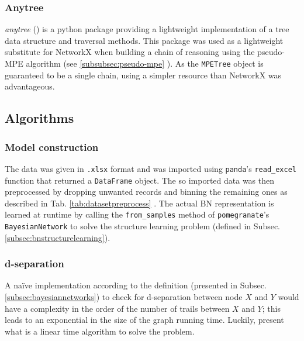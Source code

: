 \subsubsection{Anytree}
\textit{anytree} (\cite{anytree}) is a python package providing a lightweight implementation of a tree data structure and traversal methods.
This package was used as a lightweight substitute for NetworkX when building a chain of reasoning using the pseudo-MPE algorithm (see \ref{subsubsec:pseudo-mpe} ).
As the \texttt{MPETree} object is guaranteed to be a single chain, using a simpler resource than NetworkX was advantageous.

\subsection{Algorithms}

\subsubsection{Model construction}
The data was given in \texttt{.xlsx} format and was imported using \texttt{panda}'s \texttt{read\_excel} function that returned a \texttt{DataFrame} object.
The so imported data was then preprocessed by dropping unwanted records and binning the remaining ones as described in Tab. \ref{tab:datasetpreprocess} .
The actual BN representation is learned at runtime by calling the \texttt{from\_samples} method of \texttt{pomegranate}'s \texttt{BayesianNetwork} to solve the structure learning problem (defined in Subsec. \ref{subsec:bnstructurelearning}).

\subsubsection{d-separation}
A na{\"i}ve implementation according to the definition (presented in Subsec. \ref{subsec:bayesiannetworks}) to check for d-separation between node $X$ and $Y$ would have a complexity in the order of the number of trails between $X$ and $Y$; this leads to an exponential in the size of the graph running time.
Luckily, \cite{koller2007dseparation} present what is a linear time algorithm to solve the problem.

